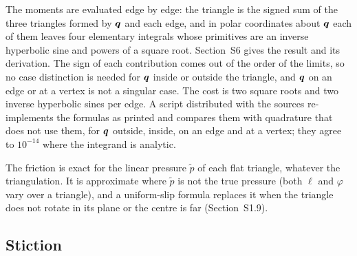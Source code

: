 The moments are evaluated edge by edge: the triangle is the signed sum of the three triangles
formed by $\boldsymbol{q}$ and each edge, and in polar coordinates about $\boldsymbol{q}$ each of them leaves four
elementary integrals whose primitives are an inverse hyperbolic sine and powers of a square
root. Section~S6 gives the result and its derivation. The
sign of each contribution comes out of the order of the limits, so no case distinction is
needed for $\boldsymbol{q}$ inside or outside the triangle, and $\boldsymbol{q}$ on an edge or at a vertex is not a
singular case. The cost is two square roots and two inverse hyperbolic sines per edge. A
script distributed with the sources re-implements the formulas as printed and compares them
with quadrature that does not use them, for $\boldsymbol{q}$ outside, inside, on an edge and at a vertex;
they agree to $10^{-14}$ where the integrand is analytic.

The friction is exact for the linear pressure $\tilde p$ of each flat triangle, whatever the
triangulation. It is approximate where $\tilde p$ is not the true pressure (both $\ell$ and
$\varphi$ vary over a triangle), and a uniform-slip formula replaces it when the triangle does
not rotate in its plane or the centre is far (Section~S1.9).

\subsection{Stiction}\label{sec:stiction}

